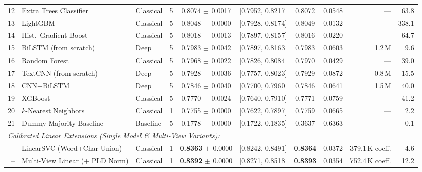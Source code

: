 \documentclass[10pt,conference]{IEEEtran}
\begin{document}
\begin{table}[t]
{\begin{tabular}{rllrccccrr}
12 & Extra Trees Classifier  & Classical   & 5 & 0.8074 $\pm$ 0.0017 & [0.7952, 0.8217] & 0.8072 & 0.0548 & ---                 & 63.8 \\
13 & LightGBM                & Classical   & 5 & 0.8048 $\pm$ 0.0000 & [0.7928, 0.8174] & 0.8049 & 0.0132 & ---                 & 338.1 \\
14 & Hist.\ Gradient Boost   & Classical   & 5 & 0.8018 $\pm$ 0.0013 & [0.7897, 0.8157] & 0.8016 & 0.0220 & ---                 & 64.7 \\
15 & BiLSTM (from scratch)   & Deep        & 5 & 0.7983 $\pm$ 0.0042 & [0.7897, 0.8163] & 0.7983 & 0.0603 & 1.2\,M              & 9.6 \\
16 & Random Forest           & Classical   & 5 & 0.7968 $\pm$ 0.0022 & [0.7826, 0.8084] & 0.7970 & 0.0429 & ---                 & 39.0 \\
17 & TextCNN (from scratch)  & Deep        & 5 & 0.7928 $\pm$ 0.0036 & [0.7757, 0.8023] & 0.7929 & 0.0872 & 0.8\,M              & 15.5 \\
18 & CNN+BiLSTM              & Deep        & 5 & 0.7846 $\pm$ 0.0040 & [0.7700, 0.7960] & 0.7846 & 0.0641 & 1.5\,M              & 40.0 \\
19 & XGBoost                 & Classical   & 5 & 0.7770 $\pm$ 0.0024 & [0.7640, 0.7910] & 0.7771 & 0.0759 & ---                 & 41.2 \\
20 & $k$-Nearest Neighbors   & Classical   & 1 & 0.7755 $\pm$ 0.0000 & [0.7622, 0.7897] & 0.7759 & 0.0665 & ---                 & 2.2 \\
21 & Dummy Majority Baseline & Baseline    & 5 & 0.1778 $\pm$ 0.0000 & [0.1722, 0.1835] & 0.3637 & 0.6363 & ---                 & 0.1 \\
\midrule
\multicolumn{10}{l}{\textit{Calibrated Linear Extensions (Single Model \& Multi-View Variants):}} \\
-- & LinearSVC (Word+Char Union) & Classical & 1 & \textbf{0.8363} $\pm$ 0.0000 & [0.8242, 0.8491] & \textbf{0.8364} & 0.0372 & 379.1\,K coeff. & 4.6 \\
-- & Multi-View Linear (+ PLD Norm) & Classical & 1 & \textbf{0.8392} $\pm$ 0.0000 & [0.8271, 0.8518] & \textbf{0.8393} & 0.0354 & 752.4\,K coeff. & 12.2 \\
\bottomrule
\end{tabular}}
\end{table}
\end{document}
